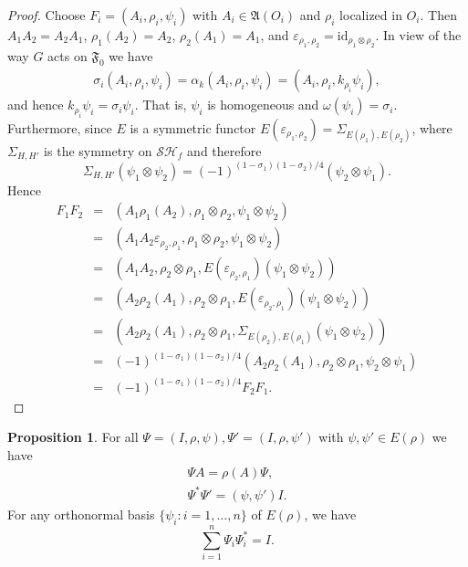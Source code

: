 \documentclass[12pt]{article}
\newcommand{\alg}[1]{\mathfrak{#1}}
\theoremstyle{definition}
\newtheorem{prop}[thm]{Proposition}
\theoremstyle{definition}
\theoremstyle{remark}
\newcommand{\ve}{\varepsilon}
\def\2#1{{\mathcal #1}}
\def\a{\alpha} \def\b{\beta} \def\g{\gamma} \def\d{\delta}
\def\om{\omega} \def\Om{\Omega} \def\dd{\partial} \def\D{\Delta}
\def\id{\mathrm{id}}
\begin{document}
\begin{proof} Choose $F_i=(A_i,\rho _i,\psi _i)$ with $A_i\in \alg{A}(O_i)$ and $\rho
  _i$ localized in $O_i$.  Then $A_1A_2=A_2A_1$, $\rho _1(A_2)=A_2$, $\rho
  _2(A_1)=A_1$, and $\ve _{\rho _1,\rho _2}=\id _{\rho _1\otimes \rho _2}$.  In view
  of the way $G$ acts on $\alg{F}_0$ we have 
  \begin{eqnarray*} \sigma _i(A_i,\rho _i,\psi _i) =\a _k(A_i,\rho _i,\psi _i) =
    (A_i,\rho _i,k_{\rho _i}\psi _i ) ,\end{eqnarray*} and hence $k_{\rho _i}\psi
  _i=\sigma _i\psi _i$.  That is, $\psi _i$ is homogeneous and $\om (\psi _i)=\sigma
  _i$.  Furthermore, since $E$ is a symmetric functor $E(\ve _{\rho _1,\rho
    _2})=\Sigma _{E(\rho _1),E(\rho _2)}$, where $\Sigma _{H,H'}$ is the symmetry on
  $\2S\2H_f$ and therefore
$$  \Sigma _{H,H'}(\psi _1\otimes \psi _2)=(-1)^{(1-\sigma _1)(1-\sigma _2)/4}(\psi
_2\otimes \psi _1) .$$ Hence
\begin{eqnarray*} F_1F_2 &=& (A_1\rho _1(A_2),\rho _1\otimes \rho _2,\psi _1\otimes  \psi _2)  \\ 
  &=& (A_1A_2 \ve _{\rho _2,\rho _1}, \rho _1\otimes \rho _2 ,\psi _1\otimes \psi_2) \\
  &=& (A_1A_2,\rho _2\otimes \rho _1,E(\ve _{\rho _2,\rho _1})(\psi _1\otimes \psi_2)) \\
  &=& (A_2\rho _2(A_1),\rho _2\otimes \rho _1, E(\ve _{\rho _2,\rho _1})(\psi_1\otimes \psi _2)) \\
  &=& (A_2\rho _2(A_1) ,\rho _2\otimes \rho _1,\Sigma _{E(\rho _2),E(\rho _1)}(\psi _1\otimes \psi _2)) \\
  &=& (-1)^{(1-\sigma _1)(1-\sigma _2)/4}(A_2\rho _2(A_1),\rho _2\otimes \rho _1,\psi_2\otimes \psi _1 ) \\
  &=& (-1)^{(1-\sigma _1)(1-\sigma _2)/4} F_2F_1 . \end{eqnarray*}
\end{proof}



\begin{prop} For all $\Psi =(I,\rho ,\psi),\Psi '=(I,\rho ,\psi ')$ with $\psi ,\psi
  '\in E(\rho)$ we have
  \begin{eqnarray}
    \Psi A = \rho (A)\Psi ,   \label{induce} \\
    \Psi ^*\Psi ' = (\psi ,\psi ')I .  
    \label{cuntz}  \end{eqnarray}
  For any orthonormal basis $\{ \psi _i:i=1,\dots, n\}$ of $E(\rho )$, we have 
  \begin{equation} \sum _{i=1}^{n}\Psi _i\Psi _i^* = I .
  \label{basisz} \end{equation}
  \label{ip} \end{prop}
\end{document}
